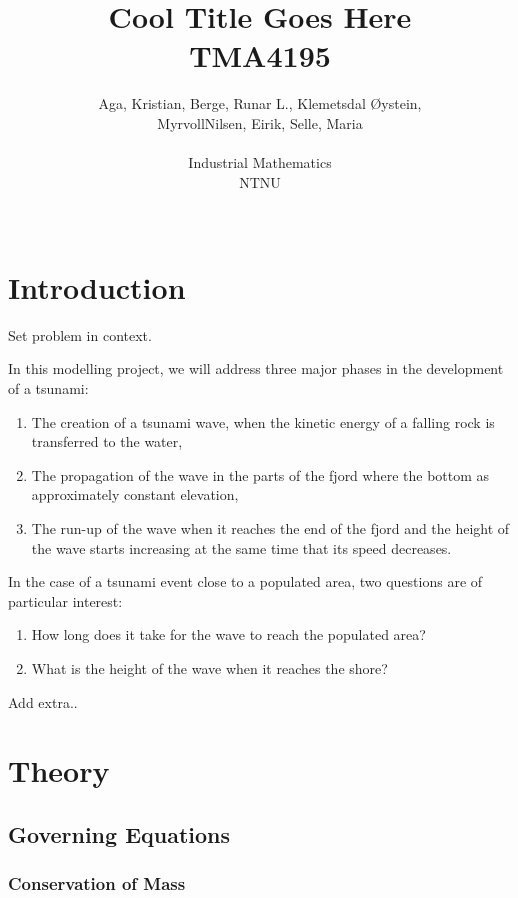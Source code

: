 \documentclass[12pt]{article}
\author{Aga, Kristian, Berge, Runar L., Klemetsdal Øystein,\\
	MyrvollNilsen, Eirik, Selle, Maria\\\\
	Industrial Mathematics\\
	NTNU \\\\
}
\title{Cool Title Goes Here \\     
	TMA4195}
\begin{document}
\maketitle
\clearpage

%
%
\section{Introduction}

Set problem in context.

In this modelling project, we will address three major phases in the development of a tsunami:
\begin{enumerate}[label = \emph{(\roman*)}]
    \item    The creation of a tsunami wave, when the kinetic energy of a falling rock is transferred to the
             water,
    \item    The propagation of the wave in the parts of the fjord where the bottom as approximately constant
             elevation,
    \item    The run-up of the wave when it reaches the end of the fjord and the height of the wave starts
             increasing at the same time that its speed decreases.
\end{enumerate}

In the case of a tsunami event close to a populated area, two questions are of particular interest:
\begin{enumerate}[label = \emph{(\roman*)}]
    \item    How long does it take for the wave to reach the populated area?
    \item    What is the height of the wave when it reaches the shore?
\end{enumerate}

Add extra..

\section{Theory}

\subsection{Governing Equations}

\subsubsection*{Conservation of Mass}
\end{document}
